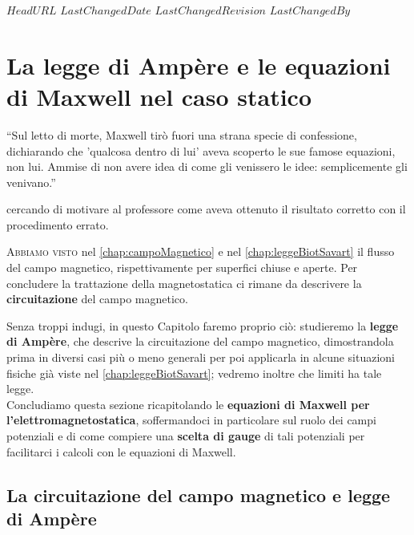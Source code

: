 \svnidlong
{$HeadURL$}
{$LastChangedDate$}
{$LastChangedRevision$}
{$LastChangedBy$}
\chapter{La legge di Ampère e le equazioni di Maxwell nel caso statico} 

\begin{introduction}
``Sul letto di morte, Maxwell tirò fuori una strana specie di confessione, dichiarando che 'qualcosa dentro di lui' aveva scoperto le sue famose equazioni, non lui. Ammise di non avere idea di come gli venissero le idee: semplicemente gli venivano.''
\begin{flushright}
	 cercando di motivare al professore come aveva ottenuto il risultato corretto con il procedimento errato.
\end{flushright}
\end{introduction}
\lettrine[findent=1pt, nindent=0pt]{A}{bbiamo visto} nel \autoref{chap:campoMagnetico} e nel \autoref{chap:leggeBiotSavart} il flusso del campo magnetico, rispettivamente per superfici chiuse e aperte. Per concludere la trattazione della magnetostatica ci rimane da descrivere la \textbf{circuitazione} del campo magnetico.

Senza troppi indugi, in questo Capitolo faremo proprio ciò: studieremo la \textbf{legge di Ampère}, che descrive la circuitazione del campo magnetico, dimostrandola prima in diversi casi più o meno generali per poi applicarla in alcune situazioni fisiche già viste nel \autoref{chap:leggeBiotSavart}; vedremo inoltre che limiti ha tale legge.\\
Concludiamo questa sezione ricapitolando le \textbf{equazioni di Maxwell per l'elettromagnetostatica}, soffermandoci in particolare sul ruolo dei campi potenziali e di come compiere una \textbf{scelta di gauge} di tali potenziali per facilitarci i calcoli con le equazioni di Maxwell.

\section{La circuitazione del campo magnetico e legge di Ampère}
